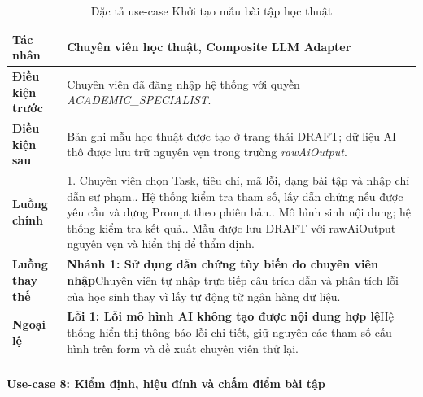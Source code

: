 \begingroup
\small
\begin{longtable}{|p{3.2cm}|p{\dimexpr\linewidth-3.2cm-4\tabcolsep-3\arrayrulewidth\relax}|}
\caption{Đặc tả use-case Khởi tạo mẫu bài tập học thuật}
\label{aihub:tab:uc_academic_generate}\\
\hline
\textbf{Tác nhân} & Chuyên viên học thuật, Composite LLM Adapter \\ \hline
\textbf{Điều kiện trước} & Chuyên viên đã đăng nhập hệ thống với quyền \textit{ACADEMIC\_SPECIALIST}. \\ \hline
\textbf{Điều kiện sau} & Bản ghi mẫu học thuật được tạo ở trạng thái DRAFT; dữ liệu AI thô được lưu trữ nguyên vẹn trong trường \textit{rawAiOutput}. \\ \hline
\textbf{Luồng chính} & 1. Chuyên viên chọn Task, tiêu chí, mã lỗi, dạng bài tập và nhập chỉ dẫn sư phạm.\newline 2. Hệ thống kiểm tra tham số, lấy dẫn chứng nếu được yêu cầu và dựng Prompt theo phiên bản.\newline 3. Mô hình sinh nội dung; hệ thống kiểm tra kết quả.\newline 4. Mẫu được lưu DRAFT với rawAiOutput nguyên vẹn và hiển thị để thẩm định. \\ \hline
\textbf{Luồng thay thế} &
\textbf{Nhánh 1: Sử dụng dẫn chứng tùy biến do chuyên viên nhập}\newline Chuyên viên tự nhập trực tiếp câu trích dẫn và phân tích lỗi của học sinh thay vì lấy tự động từ ngân hàng dữ liệu. \\ \hline
\textbf{Ngoại lệ} &
\textbf{Lỗi 1: Lỗi mô hình AI không tạo được nội dung hợp lệ}\newline Hệ thống hiển thị thông báo lỗi chi tiết, giữ nguyên các tham số cấu hình trên form và đề xuất chuyên viên thử lại. \\ \hline
\end{longtable}
\endgroup

\paragraph{Use-case 8: Kiểm định, hiệu đính và chấm điểm bài tập}

